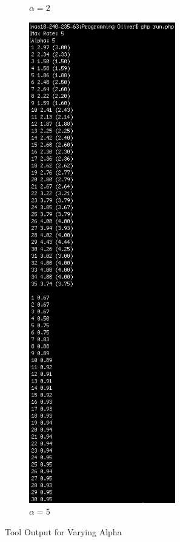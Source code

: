 \documentclass{article}
\begin{document}
\begin{figure}
\begin{subfigure}{0.5\textwidth}
\caption{$\alpha = 2$}
\label{fig:screen_alpha2}
\end{subfigure}%
\begin{subfigure}{0.5\textwidth}
\centering
\includegraphics[width=0.70\textwidth]{Screenshots/Alpha5}
\caption{$\alpha = 5$}
\label{fig:screen_alpha5}
\end{subfigure}
\caption{Tool Output for Varying Alpha}
\label{fig:tool_output}
\end{figure}
\end{document}
